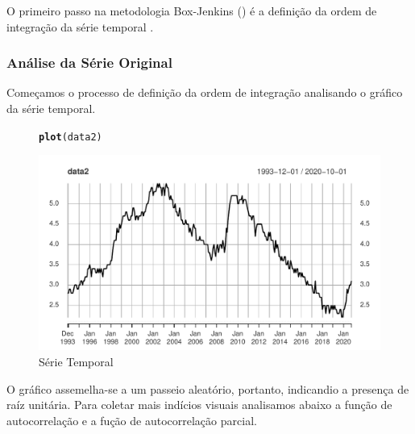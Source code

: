 \documentclass{article}\usepackage[]{graphicx}\usepackage[]{color}
\makeatletter
\def\maxwidth{ %
  \ifdim\Gin@nat@width>\linewidth
    \linewidth
  \else
    \Gin@nat@width
  \fi
}
\newcommand{\hlstd}[1]{\textcolor[rgb]{0.345,0.345,0.345}{#1}}%
\newcommand{\hlkwd}[1]{\textcolor[rgb]{0.737,0.353,0.396}{\textbf{#1}}}%
\newenvironment{kframe}{%
 \def\at@end@of@kframe{}%
 \ifinner\ifhmode%
  \def\at@end@of@kframe{\end{minipage}}%
  \begin{minipage}{\columnwidth}%
 \fi\fi%
 \def\FrameCommand##1{\hskip\@totalleftmargin \hskip-\fboxsep
 \colorbox{shadecolor}{##1}\hskip-\fboxsep
     \hskip-\linewidth \hskip-\@totalleftmargin \hskip\columnwidth}%
 \MakeFramed {\advance\hsize-\width
   \@totalleftmargin\z@ \linewidth\hsize
   \@setminipage}}%
 {\par\unskip\endMakeFramed%
 \at@end@of@kframe}
\newenvironment{knitrout}{}{} %
\makeatother
\begin{document}
        O primeiro passo na metodologia Box-Jenkins (\cite{boxjenkins}) é a definição da ordem de integração da série temporal .
    
        \subsubsection{Análise da Série Original}
        
            Começamos o processo de definição da ordem de integração analisando o gráfico da série temporal.
        
            \begin{figure}[H]
            \caption{Série Temporal}
            \centering
\begin{knitrout}
\color{fgcolor}\begin{kframe}
\begin{alltt}
\hlkwd{plot}\hlstd{(data2)}
\end{alltt}
\end{kframe}
\includegraphics[width=\maxwidth]{figure/unnamed-chunk-65-1} 

\end{knitrout}
            \end{figure}
            
            O gráfico assemelha-se a um passeio aleatório, portanto, indicandio a presença de raíz unitária. Para coletar mais indícios visuais analisamos abaixo a função de autocorrelação e a fução de autocorrelação parcial.
            
\end{document}
